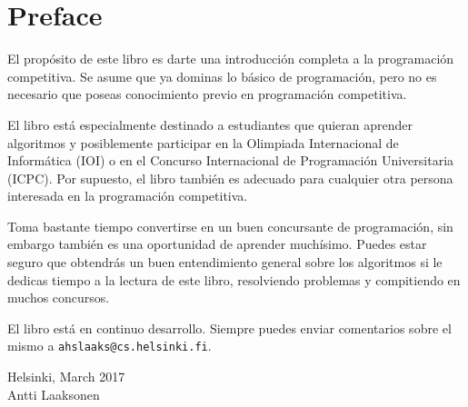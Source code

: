 \chapter*{Preface}


El prop\'osito de este libro es darte
una introducci\'on completa a la programaci\'on competitiva.
Se asume que ya dominas lo b\'asico de programaci\'on, pero no
es necesario que poseas conocimiento previo en programaci\'on
competitiva.

El libro est\'a especialmente destinado a estudiantes que
quieran aprender algoritmos y posiblemente participar en
la Olimpiada Internacional de Inform\'atica (IOI) o en el
Concurso Internacional de Programaci\'on Universitaria (ICPC).
Por supuesto, el libro tambi\'en es adecuado para
cualquier otra persona interesada en la programaci\'on 
competitiva.

Toma bastante tiempo convertirse en un buen concursante de
programaci\'on, sin embargo tambi\'en es una oportunidad de
aprender much\'isimo. Puedes estar seguro que obtendr\'as un
buen entendimiento general sobre los algoritmos si le
dedicas tiempo a la lectura de este libro, resolviendo
problemas y compitiendo en muchos concursos.

El libro est\'a en continuo desarrollo. Siempre
puedes enviar comentarios sobre el mismo
a \texttt{ahslaaks@cs.helsinki.fi}.

\begin{flushright}
Helsinki, March 2017 \\
Antti Laaksonen
\end{flushright}
